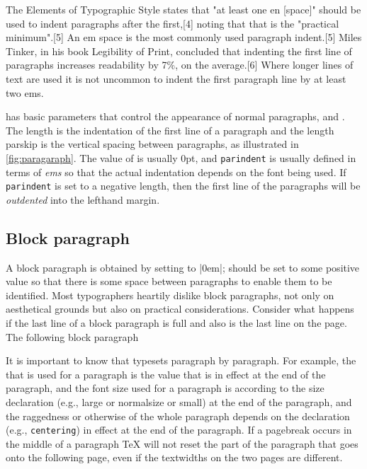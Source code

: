 The Elements of Typographic Style states that "at least one en [space]" should be used to indent paragraphs after the first,[4] noting that that is the "practical minimum".[5] An em space is the most commonly used paragraph indent.[5] Miles Tinker, in his book Legibility of Print, concluded that indenting the first line of paragraphs increases readability by 7\%, on the average.[6] Where longer lines of text are used it is not uncommon to indent the first paragraph line by at least two ems.

\begin{macro}{\parindent}
\begin{macro}{\parskip}
\begin{macro}{\noindent}
\LaTeXe has basic parameters that control the appearance of normal paragraphs,
 and  .
The length   is the indentation of the first line of a paragraph and the length
parskip is the vertical spacing between paragraphs, as illustrated in \ref{fig:paragaraph}. The
value of  is usually 0pt, and \texttt{parindent} is usually defined in terms of \textit{ems}
so that the actual indentation depends on the font being used. If \texttt{parindent} is set to a
negative length, then the first line of the paragraphs will be \textit{outdented} into the lefthand
margin.
\end{macro}
\end{macro}
\end{macro}



\subsection{Block paragraph}

A block paragraph is obtained by setting  to |0em|;  should be set to
some positive value so that there is some space between paragraphs to enable them to be
identified. Most typographers heartily dislike block paragraphs, not only on aesthetical
grounds but also on practical considerations. Consider what happens if the last line of a
block paragraph is full and also is the last line on the page. The following block paragraph

It is important to know that \latex typesets paragraph by paragraph. For example, the
 that is used for a paragraph is the value that is in effect at the end of the
paragraph, and the font size used for a paragraph is according to the size declaration (e.g.,
large or normalsize or small) at the end of the paragraph, and the raggedness or
otherwise of the whole paragraph depends on the declaration (e.g., \texttt{centering}) in effect
at the end of the paragraph. If a pagebreak occurs in the middle of a paragraph TeX will
not reset the part of the paragraph that goes onto the following page, even if the textwidths
on the two pages are different.


